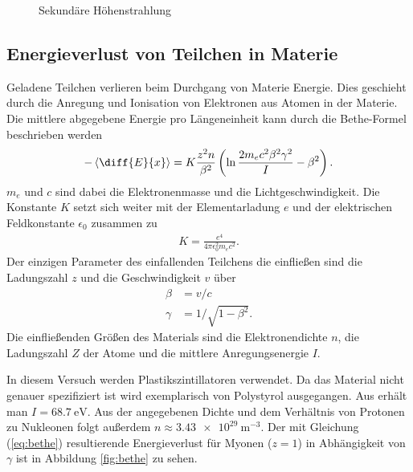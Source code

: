 \begin{figure}[h]
\begin{subfigure}[h]{0.5\textwidth}
  \label{fig:fluss}
  \end{subfigure}
  \caption{Sekundäre Höhenstrahlung}
\end{figure}

\subsection{Energieverlust von Teilchen in Materie}
Geladene Teilchen verlieren beim Durchgang von Materie Energie. Dies geschieht durch die Anregung und Ionisation von Elektronen aus Atomen in der Materie. Die mittlere abgegebene Energie pro Längeneinheit kann durch die Bethe-Formel beschrieben werden\cite{sigmund2014particle}
\begin{align}
  -\left\langle \diff{E}{x} \right\rangle=K\frac{z^2n}{\beta^2}\left(\ln \frac{2m_ec^2\beta^2\gamma^2}{I} -\beta^2 \right).
  \label{eq:bethe}
\end{align}
$m_e$ und $c$ sind dabei die Elektronenmasse und die Lichtgeschwindigkeit. Die Konstante $K$ setzt sich weiter mit der Elementarladung $e$ und der elektrischen Feldkonstante $\epsilon_0$ zusammen zu
\begin{align*}
  K=\frac{e^4}{4\pi \epsilon_0^2m_ec^2}.
\end{align*}
Der einzigen Parameter des einfallenden Teilchens die einfließen sind die Ladungszahl $z$ und die Geschwindigkeit $v$ über
\begin{align*}
  \beta&=v/c\\
  \gamma&=1/\sqrt{1-\beta^2}.
\end{align*}
Die einfließenden Größen des Materials sind die Elektronendichte $n$, die Ladungszahl $Z$ der Atome und die mittlere Anregungsenergie $I$.

In diesem Versuch werden Plastikszintillatoren verwendet. Da das Material nicht genauer spezifiziert ist wird exemplarisch von Polystyrol ausgegangen. Aus \cite{polystyrene} erhält man $I=\SI{68.7}{\electronvolt}$. Aus der angegebenen Dichte und dem Verhältnis von Protonen zu Nukleonen folgt außerdem $n\approx \SI{3.43e29}{\metre^{-3}}$. Der mit Gleichung (\ref{eq:bethe}) resultierende Energieverlust für Myonen ($z=1$) in Abhängigkeit von $\gamma$ ist in Abbildung \ref{fig:bethe} zu sehen.

